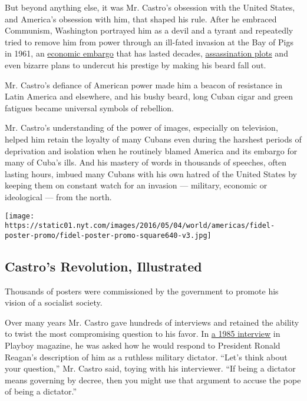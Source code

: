 But beyond anything else, it was Mr. Castro's obsession with the United
States, and America's obsession with him, that shaped his rule. After he
embraced Communism, Washington portrayed him as a devil and a tyrant and
repeatedly tried to remove him from power through an ill-fated invasion
at the Bay of Pigs in 1961, an
\href{http://www.treasury.gov/resource-center/sanctions/Programs/Pages/cuba.aspx}{economic
embargo} that has lasted decades,
\href{http://washington.blogs.nytimes.com/2007/06/26/a-plot-to-assassinate-castro-was-approved-by-cia-director-allen-dulles/}{assassination
plots} and even bizarre plans to undercut his prestige by making his
beard fall out.

Mr. Castro's defiance of American power made him a beacon of resistance
in Latin America and elsewhere, and his bushy beard, long Cuban cigar
and green fatigues became universal symbols of rebellion.

Mr. Castro's understanding of the power of images, especially on
television, helped him retain the loyalty of many Cubans even during the
harshest periods of deprivation and isolation when he routinely blamed
America and its embargo for many of Cuba's ills. And his mastery of
words in thousands of speeches, often lasting hours, imbued many Cubans
with his own hatred of the United States by keeping them on constant
watch for an invasion --- military, economic or ideological --- from the
north.

\href{https://www.nytimes.com/interactive/2016/11/26/world/americas/fidel-castro-cuban-posters.html}{}

\texttt{[image: https://static01.nyt.com/images/2016/05/04/world/americas/fidel-poster-promo/fidel-poster-promo-square640-v3.jpg]}

\hypertarget{castros-revolution-illustrated}{%
\subsection{Castro's Revolution,
Illustrated}\label{castros-revolution-illustrated}}

Thousands of posters were commissioned by the government to promote his
vision of a socialist society.

Over many years Mr. Castro gave hundreds of interviews and retained the
ability to twist the most compromising question to his favor. In
\href{http://www.playboy.com/articles/50-years-of-the-playboy-interview-fidel-castro}{a
1985 interview} in Playboy magazine, he was asked how he would respond
to President Ronald Reagan's description of him as a ruthless military
dictator. ``Let's think about your question,'' Mr. Castro said, toying
with his interviewer. ``If being a dictator means governing by decree,
then you might use that argument to accuse the pope of being a
dictator.''

